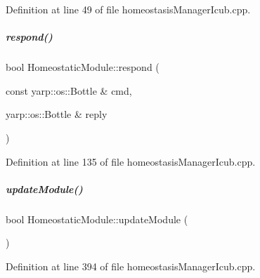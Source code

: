 Definition at line 49 of file homeostasis\+Manager\+Icub.\+cpp.

\mbox{\label{group__homeostasis_a5b37922dc43bdd683b89c93c91e89db1}} 
\subparagraph{\texorpdfstring{respond()}{respond()}}
{\footnotesize\ttfamily bool Homeostatic\+Module\+::respond (\begin{DoxyParamCaption}\item[{const yarp\+::os\+::\+Bottle \&}]{cmd,  }\item[{yarp\+::os\+::\+Bottle \&}]{reply }\end{DoxyParamCaption})}



Definition at line 135 of file homeostasis\+Manager\+Icub.\+cpp.

\mbox{\label{group__homeostasis_a614902e3bfe699aea53497a100929b1c}} 
\subparagraph{\texorpdfstring{update\+Module()}{updateModule()}}
{\footnotesize\ttfamily bool Homeostatic\+Module\+::update\+Module (\begin{DoxyParamCaption}{ }\end{DoxyParamCaption})}



Definition at line 394 of file homeostasis\+Manager\+Icub.\+cpp.

